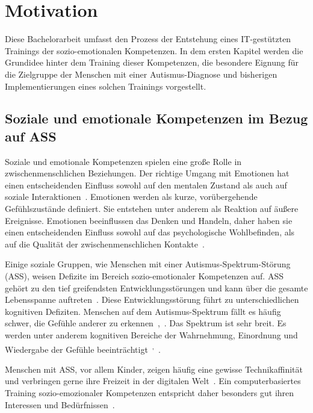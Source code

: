 \section{Motivation}
Diese Bachelorarbeit umfasst den Prozess der Entstehung eines IT-gestützten Trainings der sozio-emotionalen Kompetenzen. In dem ersten Kapitel werden die Grundidee hinter dem Training dieser Kompetenzen, die besondere Eignung für die Zielgruppe der Menschen mit einer Autismus-Diagnose und bisherigen Implementierungen eines solchen Trainings vorgestellt.

\subsection{Soziale und emotionale Kompetenzen im Bezug auf ASS}
Soziale und emotionale Kompetenzen spielen eine große Rolle in zwischenmenschlichen Beziehungen. Der richtige Umgang mit Emotionen hat einen entscheidenden Einfluss sowohl auf den mentalen Zustand als auch auf soziale Interaktionen~\cite{Pfeiffer.2012}. Emotionen werden als kurze, vorübergehende Gefühlszustände definiert. Sie entstehen unter anderem als Reaktion auf äußere Ereignisse. Emotionen beeinflussen das Denken und Handeln, daher haben sie einen entscheidenden Einfluss sowohl auf das psychologische Wohlbefinden, als auf die Qualität der zwischenmenschlichen Kontakte~\cite{Pfeiffer.2012}.

Einige soziale Gruppen, wie Menschen mit einer Autismus-Spektrum-Störung (ASS), weisen Defizite im Bereich sozio-emotionaler Kompetenzen auf. ASS gehört zu den tief greifendsten Entwicklungsstörungen und kann über die gesamte Lebensspanne auftreten~\cite{Spektrum2015}. Diese Entwicklungsstörung führt zu unterschiedlichen kognitiven Defiziten. Menschen auf dem Autismus-Spektrum fällt es häufig schwer, die Gefühle anderer zu erkennen~\cite{Hobson1993},~\cite{Dziobek.2008}. Das Spektrum ist sehr breit. Es werden unter anderem kognitiven Bereiche der Wahrnehmung, Einordnung und Wiedergabe der Gefühle beeinträchtigt~\cite{Kliemann.2012}\textsuperscript{,}~\cite{South.2011}.

Menschen mit ASS, vor allem Kinder, zeigen häufig eine gewisse Technikaffinität und verbringen gerne ihre Freizeit in der digitalen Welt~\cite{Moore2000}. Ein computerbasiertes Training sozio-emozionaler Kompetenzen entspricht daher besonders gut ihren Interessen und Bedürfnissen~\cite{Kohls.2011}.

